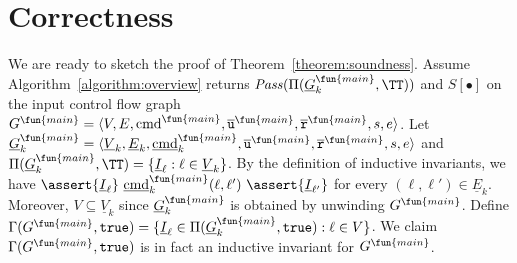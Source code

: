 
\section{Correctness}\label{sec:correctness}

We are ready to sketch the proof of Theorem~\ref{theorem:soundness}. 
Assume Algorithm~\ref{algorithm:overview} returns $\mathit{Pass} (\Pi (\underline{G}^{\fun{main}}_k, \TT))$ and $S[\bullet]$ on the input control flow graph $G^\fun{main} =
\langle V, E, \textmd{cmd}^\fun{main}, \overline{\mathtt{u}}^\fun{main}, \overline{\mathtt{r}}^\fun{main},s,e \rangle$. Let $\underline{G}^{\fun{main}}_k = \langle \underline{V}_k, \underline{E}_k,
\underline{\textmd{cmd}}_k^\fun{main} , \overline{\mathtt{u}}^\fun{main}, \overline{\mathtt{r}}^\fun{main},s,e \rangle$ and $\Pi (\underline{G}^{\fun{main}}_k, \TT) = \{ \underline{I}_{\ell}
: \ell \in \underline{V}_k \}$. By the definition of inductive invariants, we have
$\assert{\underline{I}_{\ell}}\ \underline{\textmd{cmd}}_k^\fun{main} (\ell, \ell')\ \assert{\underline{I}_{\ell'}}$
for every $(\ell, \ell') \in  \underline{E}_k$. Moreover, $V \subseteq  \underline{V}_k$ since
$\underline{G}^{\fun{main}}_k$ is obtained by unwinding $G^\fun{main}$. Define 
$\Gamma (G^\fun{main}, \mathtt{true}) = \{ \underline{I}_{\ell} \in \Pi (\underline{G}^{\fun{main}}_k,
\mathtt{true}) : \ell \in V \}$. We claim $\Gamma (G^\fun{main}, \mathtt{true})$
is in fact an inductive invariant for $G^\fun{main}$. 

